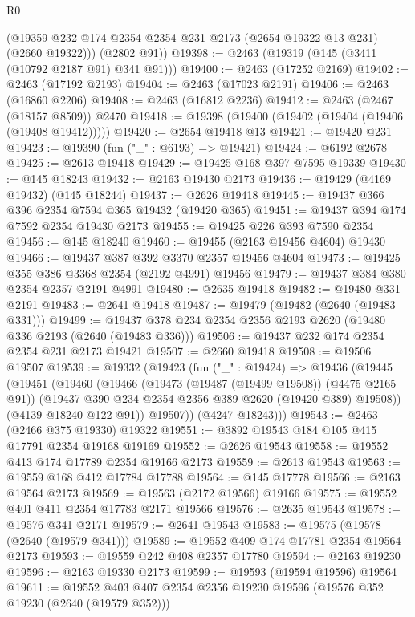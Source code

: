 \begin{lexlean}{R0}
\begin{coremodule}
        (@19359 @232 @174 @2354 @2354 @231 @2173 (@2654 @19322 @13 @231) (@2660 @19322)))
      (@2802 @91))
@19398 := @2463 (@19319 (@145 (@3411 (@10792 @2187 @91) @341 @91)))
@19400 := @2463 (@17252 @2169)
@19402 := @2463 (@17192 @2193)
@19404 := @2463 (@17023 @2191)
@19406 := @2463 (@16860 @2206)
@19408 := @2463 (@16812 @2236)
@19412 := @2463 (@2467 (@18157 @8509)) @2470
@19418 := @19398 (@19400 (@19402 (@19404 (@19406 (@19408 @19412)))))
@19420 := @2654 @19418 @13
@19421 := @19420 @231
@19423 := @19390 (fun ("_" : @6193) => @19421)
@19424 := @6192 @2678
@19425 := @2613 @19418
@19429 := @19425 @168 @397 @7595 @19339
@19430 := @145 @18243
@19432 := @2163 @19430 @2173
@19436 := @19429 (@4169 @19432) (@145 @18244)
@19437 := @2626 @19418
@19445 := @19437 @366 @396 @2354 @7594 @365 @19432 (@19420 @365)
@19451 := @19437 @394 @174 @7592 @2354 @19430 @2173
@19455 := @19425 @226 @393 @7590 @2354
@19456 := @145 @18240
@19460 := @19455 (@2163 @19456 @4604) @19430
@19466 := @19437 @387 @392 @3370 @2357 @19456 @4604
@19473 := @19425 @355 @386 @3368 @2354 (@2192 @4991) @19456
@19479 := @19437 @384 @380 @2354 @2357 @2191 @4991
@19480 := @2635 @19418
@19482 := @19480 @331 @2191
@19483 := @2641 @19418
@19487 := @19479 (@19482 (@2640 (@19483 @331)))
@19499 := @19437 @378 @234 @2354 @2356 @2193 @2620 (@19480 @336 @2193 (@2640 (@19483 @336)))
@19506 := @19437 @232 @174 @2354 @2354 @231 @2173 @19421
@19507 := @2660 @19418
@19508 := @19506 @19507
@19539 := @19332
    (@19423
      (fun ("_" : @19424) =>
      @19436
        (@19445
          (@19451
            (@19460
              (@19466
                (@19473 (@19487 (@19499 @19508)) (@4475 @2165 @91))
                (@19437 @390 @234 @2354 @2356 @389 @2620 (@19420 @389) @19508))
              (@4139 @18240 @122 @91))
            @19507))
        (@4247 @18243)))
@19543 := @2463 (@2466 @375 @19330) @19322
@19551 := @3892 @19543 @184 @105 @415 @17791 @2354 @19168 @19169
@19552 := @2626 @19543
@19558 := @19552 @413 @174 @17789 @2354 @19166 @2173
@19559 := @2613 @19543
@19563 := @19559 @168 @412 @17784 @17788
@19564 := @145 @17778
@19566 := @2163 @19564 @2173
@19569 := @19563 (@2172 @19566) @19166
@19575 := @19552 @401 @411 @2354 @17783 @2171 @19566
@19576 := @2635 @19543
@19578 := @19576 @341 @2171
@19579 := @2641 @19543
@19583 := @19575 (@19578 (@2640 (@19579 @341)))
@19589 := @19552 @409 @174 @17781 @2354 @19564 @2173
@19593 := @19559 @242 @408 @2357 @17780
@19594 := @2163 @19230
@19596 := @2163 @19330 @2173
@19599 := @19593 (@19594 @19596) @19564
@19611 := @19552 @403 @407 @2354 @2356 @19230 @19596 (@19576 @352 @19230 (@2640 (@19579 @352)))

\end{coremodule}
\end{lexlean}
